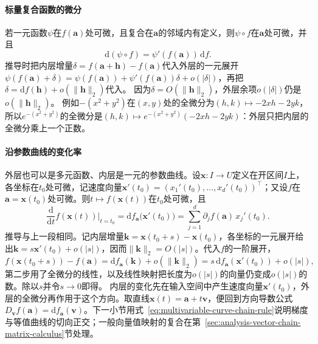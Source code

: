 \paragraph{标量复合函数的微分}
若一元函数$\psi$在$f(\bm a)$处可微，且复合在$\bm a$的邻域内有定义，则$\psi\circ f$在$\bm a$处可微，并且
\[
 \mathrm d(\psi\circ f)=\psi'(f(\bm a))\,\mathrm df.
\]
推导时把内层增量$\delta=f(\bm a+\bm h)-f(\bm a)$代入外层的一元展开$\psi(f(\bm a)+\delta)=\psi(f(\bm a))+\psi'(f(\bm a))\delta+o(|\delta|)$，再把$\delta=\mathrm df(\bm h)+o(\lVert\bm h\rVert_2)$代入。
因为$\delta=O(\lVert\bm h\rVert_2)$，外层余项$o(|\delta|)$仍是$o(\lVert\bm h\rVert_2)$。
例如$-(x^2+y^2)$在$(x,y)$处的全微分为$(h,k)\mapsto-2xh-2yk$，所以$e^{-(x^2+y^2)}$的全微分是$(h,k)\mapsto e^{-(x^2+y^2)}(-2xh-2yk)$：外层只把内层的全微分乘上一个正数。

\paragraph{沿参数曲线的变化率}
外层也可以是多元函数、内层是一元的参数曲线。设$\bm x:I\to U$定义在开区间$I$上，各坐标在$t_0$处可微，记速度向量$\bm x'(t_0)=(x_1'(t_0),\ldots,x_d'(t_0))^\top$；又设$f$在$\bm a=\bm x(t_0)$处可微。则$t\mapsto f(\bm x(t))$在$t_0$处可微，且
\begin{equation}
 \frac{\mathrm d}{\mathrm dt}f(\bm x(t))\Big|_{t=t_0}
 =\mathrm df_{\bm a}\bigl(\bm x'(t_0)\bigr)
 =\sum_{j=1}^d\partial_jf(\bm a)\,x_j'(t_0).
\label{eq:multivariable-curve-chain-rule}
\end{equation}
推导与上一段相同。记内层增量$\bm k=\bm x(t_0+s)-\bm x(t_0)$，各坐标的一元展开给出$\bm k=s\bm x'(t_0)+o(|s|)$，因而$\lVert\bm k\rVert_2=O(|s|)$。代入$f$的一阶展开，
\[
 f(\bm x(t_0+s))-f(\bm a)=\mathrm df_{\bm a}(\bm k)+o(\lVert\bm k\rVert_2)
 =s\,\mathrm df_{\bm a}(\bm x'(t_0))+o(|s|),
\]
第二步用了全微分的线性，以及线性映射把长度为$o(|s|)$的向量仍变成$o(|s|)$的数。除以$s$并令$s\to0$即得。
内层的变化先在输入空间中产生速度向量$\bm x'(t_0)$，外层的全微分再作用于这个方向。取直线$\bm x(t)=\bm a+t\bm v$，便回到方向导数公式$D_{\bm v}f(\bm a)=\mathrm df_{\bm a}(\bm v)$。下一小节用式~\eqref{eq:multivariable-curve-chain-rule}说明梯度与等值曲线的切向正交；一般向量值映射的复合在第~\ref{sec:analysis-vector-chain-matrix-calculus}节处理。

